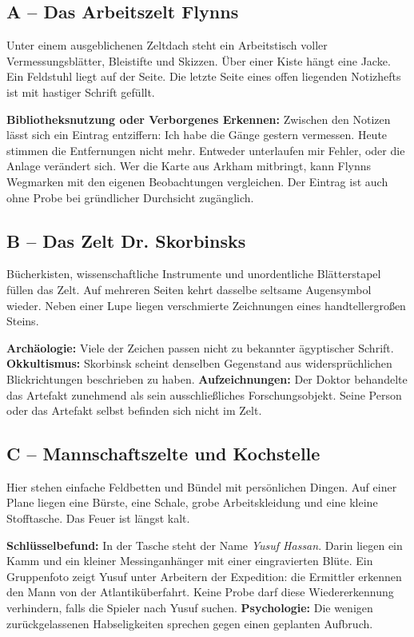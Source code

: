 \subsection{A -- Das Arbeitszelt Flynns}
\begin{vorlesetextalle}
Unter einem ausgeblichenen Zeltdach steht ein Arbeitstisch voller Vermessungsblätter, Bleistifte und Skizzen. Über einer Kiste hängt eine Jacke. Ein Feldstuhl liegt auf der Seite. Die letzte Seite eines offen liegenden Notizhefts ist mit hastiger Schrift gefüllt.
\end{vorlesetextalle}
\begin{meisterinfo}
\textbf{Bibliotheksnutzung oder Verborgenes Erkennen:} Zwischen den Notizen lässt sich ein Eintrag entziffern: \glqq{}Ich habe die Gänge gestern vermessen. Heute stimmen die Entfernungen nicht mehr. Entweder unterlaufen mir Fehler, oder die Anlage verändert sich.\grqq{} Wer die Karte aus Arkham mitbringt, kann Flynns Wegmarken mit den eigenen Beobachtungen vergleichen. Der Eintrag ist auch ohne Probe bei gründlicher Durchsicht zugänglich.
\end{meisterinfo}
\subsection{B -- Das Zelt Dr. Skorbinsks}
\begin{vorlesetextalle}
Bücherkisten, wissenschaftliche Instrumente und unordentliche Blätterstapel füllen das Zelt. Auf mehreren Seiten kehrt dasselbe seltsame Augensymbol wieder. Neben einer Lupe liegen verschmierte Zeichnungen eines handtellergro\ss{}en Steins.
\end{vorlesetextalle}
\begin{meisterinfo}
\textbf{Archäologie:} Viele der Zeichen passen nicht zu bekannter ägyptischer Schrift. \textbf{Okkultismus:} Skorbinsk scheint denselben Gegenstand aus widersprüchlichen Blickrichtungen beschrieben zu haben. \textbf{Aufzeichnungen:} Der Doktor behandelte das Artefakt zunehmend als sein ausschlie\ss{}liches Forschungsobjekt. Seine Person oder das Artefakt selbst befinden sich nicht im Zelt.
\end{meisterinfo}
\subsection{C -- Mannschaftszelte und Kochstelle}
\begin{vorlesetextalle}
Hier stehen einfache Feldbetten und Bündel mit persönlichen Dingen. Auf einer Plane liegen eine Bürste, eine Schale, grobe Arbeitskleidung und eine kleine Stofftasche. Das Feuer ist längst kalt.
\end{vorlesetextalle}
\begin{meisterinfo}
\textbf{Schlüsselbefund:} In der Tasche steht der Name \emph{Yusuf Hassan}. Darin liegen ein Kamm und ein kleiner Messinganhänger mit einer eingravierten Blüte. Ein Gruppenfoto zeigt Yusuf unter Arbeitern der Expedition: die Ermittler erkennen den Mann von der Atlantiküberfahrt. Keine Probe darf diese Wiedererkennung verhindern, falls die Spieler nach Yusuf suchen. \textbf{Psychologie:} Die wenigen zurückgelassenen Habseligkeiten sprechen gegen einen geplanten Aufbruch.
\end{meisterinfo}
